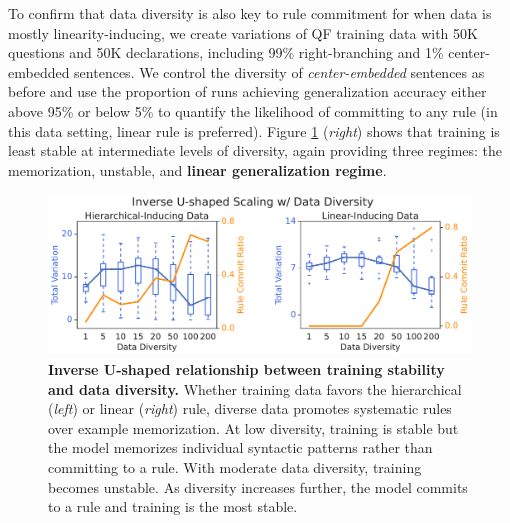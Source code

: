 To confirm that data diversity is also key to rule commitment for when data is mostly linearity-inducing, we create variations of QF training data with 50K questions and 50K declarations, including 99\% right-branching and 1\% center-embedded sentences. We control the diversity of \textit{center-embedded} sentences as before and use the proportion of runs achieving generalization accuracy either above 95\% or below 5\% to quantify the likelihood of committing to any rule (in this data setting, linear rule is preferred). Figure \ref{fig:data_diversity_uscale} (\textit{right}) shows that training is least stable at intermediate levels of diversity, again providing three regimes: the memorization, unstable, and \textbf{linear generalization regime}.


\begin{figure}[t]
    \centering
    \includegraphics[width=0.8\linewidth]{figures/data_diversity_uscale.pdf}
    \caption{\textbf{Inverse U-shaped relationship between training stability and data diversity.} Whether training data favors the hierarchical (\textit{left}) or linear (\textit{right}) rule, diverse data promotes systematic rules over example memorization. At low diversity, training is stable but the model memorizes individual syntactic patterns rather than committing to a rule. With moderate data diversity, training becomes unstable. As diversity increases further, the model commits to a rule and training is the most stable.} 
    \label{fig:data_diversity_uscale}
    \vspace{-4px}
\end{figure}